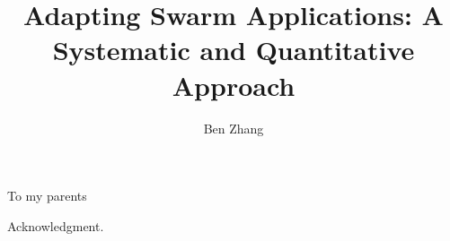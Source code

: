 \documentclass{ucbthesis}
\begin{document}
\title{Adapting Swarm Applications: A Systematic and Quantitative Approach}
\author{Ben Zhang}

\maketitle
\approvalpage
\copyrightpage



\begin{frontmatter}
  \begin{dedication}
    \null\vfil
    \begin{center}
      \vspace*{\fill}
      To my parents
      \vspace*{\fill}
    \end{center}
    \vfil\null
  \end{dedication}

  \tableofcontents
  \clearpage
  \listoffigures
  \clearpage
  \listoftables

  \begin{acknowledgements}
    Acknowledgment.
  \end{acknowledgements}
\end{frontmatter}

\pagestyle{headings}






\printbibliography
\end{document}
